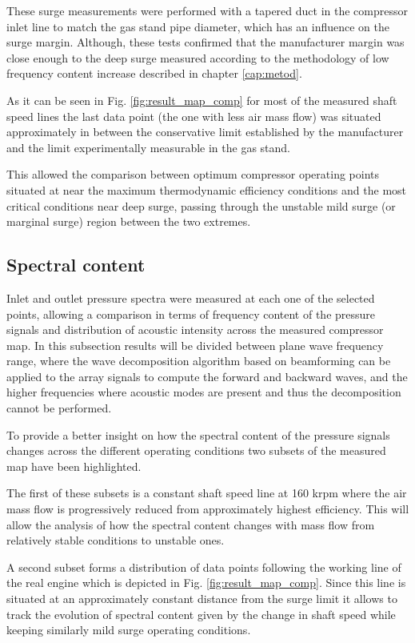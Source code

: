 These surge measurements were performed with a tapered duct in the compressor inlet line to match the gas stand pipe diameter, which has an influence on the surge margin. Although, these tests confirmed that the manufacturer margin was close enough to the deep surge measured according to the methodology of low frequency content increase described in chapter \ref{cap:metod}. 

As it can be seen in Fig. \ref{fig:result_map_comp} for most of the measured shaft speed lines the last data point (the one with less air mass flow) was situated approximately in between the conservative limit established by the manufacturer and the limit experimentally measurable in the gas stand. 

This allowed the comparison between optimum compressor operating points situated at near the maximum thermodynamic efficiency conditions and the most critical conditions near deep surge, passing through the unstable mild surge (or marginal surge) region between the two extremes.

\subsection{Spectral content}

Inlet and outlet pressure spectra were measured at each one of the selected points, allowing a comparison in terms of frequency content of the pressure signals and distribution of acoustic intensity across the measured compressor map. In this subsection results will be divided between plane wave frequency range, where the wave decomposition algorithm based on beamforming can be applied to the array signals to compute the forward and backward waves, and the higher frequencies where acoustic modes are present and thus the decomposition cannot be performed.

To provide a better insight on how the spectral content of the pressure signals changes across the different operating conditions two subsets of the measured map have been highlighted.

The first of these subsets is a constant shaft speed line at 160 krpm where the air mass flow is progressively reduced from approximately highest efficiency. This will allow the analysis of how the spectral content changes with mass flow from relatively stable conditions to unstable ones.

A second subset forms a distribution of data points following the working line of the real engine which is depicted in Fig. \ref{fig:result_map_comp}. Since this line is situated at an  approximately constant distance from the surge limit it allows to track the evolution of spectral content given by the change in shaft speed while keeping similarly mild surge operating conditions. 

